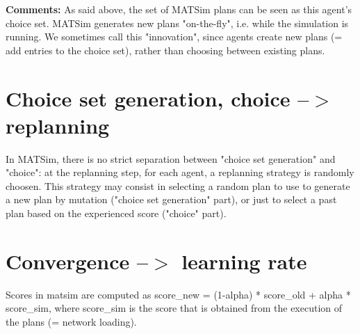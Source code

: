 \documentclass[a4paper,11pt]{report}
\begin{document}
\textbf{Comments:} As said above, the set of MATSim plans can   be seen as this agent's choice set. MATSim generates new plans   "on-the-fly", i.e. while the simulation is running. We sometimes  call  this "innovation", since agents create new plans (= add entries to  the  choice set), rather than choosing between existing plans.

\vfill\eject
\section{Choice set generation, choice --$>$ replanning}



In MATSim, there is no strict separation between "choice set  generation" and "choice": at the replanning step, for each agent, a  replanning strategy is randomly choosen. This strategy may consist in  selecting a random plan to use to generate a new plan by mutation  ("choice set generation" part), or just to select a past plan based on  the experienced score ("choice" part).

\vfill\eject
\section{Convergence --$>$ learning rate}



Scores in matsim are computed as score\_new = (1-alpha) * score\_old +   alpha * score\_sim, where score\_sim is the score that is obtained from   the execution of the plans (= network loading).
\end{document}
